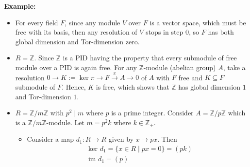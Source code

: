 \noindent\textbf{Example:} \begin{itemize}
    \item For every field $F$, since any module $V$ over $F$ is a vector space, which must be free with its basis, then any resolution of $V$ stops in step $0$, so $F$ has both global dimension and Tor-dimension zero.

    \item $R= \mathbb{Z}$. Since $\mathbb{Z}$ is a PID having the property that every submodule of free module over a PID is again free. For any $\mathbb{Z}$-module (abelian group) $A$, take a resolution $0\to K:=\ker \pi \to F\xrightarrow{\pi} A\to0$ of $A$ with $F$ free and $K\subseteq F$ submodule of $F$. Hence, $K$ is free, which shows that $\mathbb{Z}$ has global dimension $1$ and Tor-dimension $1$.

    \item $R= \mathbb{Z}/ m\mathbb{Z}$ with $p^2\mid m$ where $p$ is a prime integer. Consider $A= \mathbb{Z}/ p\mathbb{Z}$ which is a $\mathbb{Z}/ m\mathbb{Z}$-module. Let $m=p^2k$ where $k \in \mathbb{Z}_+$.
    \begin{itemize}
        \item Consider a map $d_1: R\to R$ given by $x\mapsto px$. Then
        \begin{align*}
            &\text{ker }d_1= \{x\in R\mid px=0\}=(pk)\\
            &\text{im }d_1=(p) 
        \end{align*}


\end{itemize}
\end{itemize}
